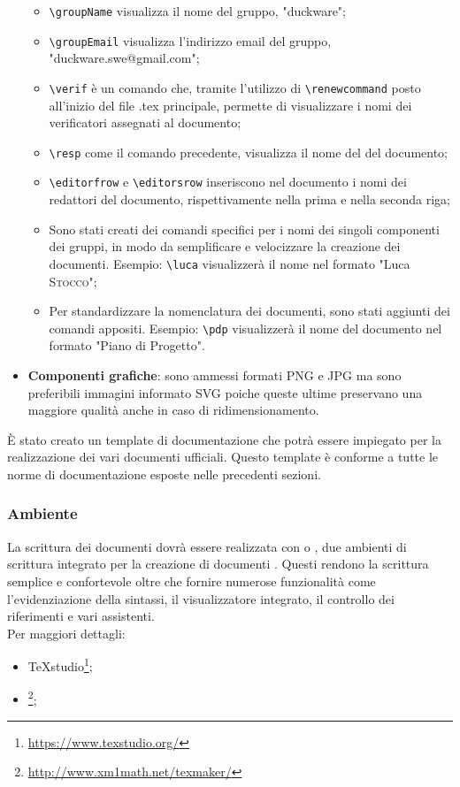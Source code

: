 \begin{itemize}
    \begin{itemize}
        \item \texttt{\textbackslash groupName} visualizza il nome del gruppo, "duckware";
        \item \texttt{\textbackslash groupEmail} visualizza l'indirizzo email del gruppo, "duckware.swe@gmail.com";
        \item \texttt{\textbackslash verif} è un comando che, tramite l'utilizzo di \texttt{\textbackslash renewcommand} posto all'inizio del file .tex principale, permette di visualizzare i nomi dei verificatori assegnati al documento;
        \item \texttt{\textbackslash resp} come il comando precedente, visualizza il nome del  del documento;
        \item \texttt{\textbackslash editorfrow} e \texttt{\textbackslash editorsrow} inseriscono nel documento i nomi dei redattori del documento, rispettivamente nella prima e nella seconda riga;
        \item Sono stati creati dei comandi specifici per i nomi dei singoli componenti dei gruppi, in modo da semplificare e velocizzare la creazione dei documenti. Esempio: \texttt{\textbackslash luca} visualizzerà il nome nel formato "Luca \textsc{Stocco}";
        \item Per standardizzare la nomenclatura dei documenti, sono stati aggiunti dei comandi appositi. Esempio: \texttt{\textbackslash pdp} visualizzerà il nome del documento nel formato "Piano di Progetto".
    \end{itemize}
    \item \textbf{Componenti grafiche}: sono ammessi formati PNG e JPG ma sono preferibili immagini informato SVG poiche queste ultime preservano una maggiore qualità anche in caso di ridimensionamento.
\end{itemize}
È stato creato un template di documentazione che potrà essere impiegato per la realizzazione dei vari documenti ufficiali. Questo template è conforme a tutte le norme di documentazione esposte nelle precedenti sezioni.
\subsubsection{Ambiente}
La scrittura dei documenti dovrà essere realizzata con  o , due ambienti di scrittura integrato per la creazione di documenti . Questi  rendono la scrittura  semplice e confortevole oltre che fornire numerose funzionalità come l'evidenziazione della sintassi, il visualizzatore integrato, il controllo dei riferimenti e vari assistenti.\\Per maggiori dettagli:
\begin{itemize}
    \item TeXstudio\footnote{\href{https://www.texstudio.org/}{https://www.texstudio.org/}};
    \item {}\footnote{\href{http://www.xm1math.net/texmaker/}{http://www.xm1math.net/texmaker/}};
\end{itemize}
